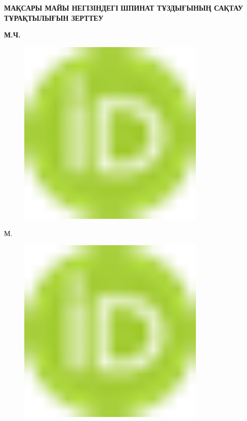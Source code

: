 
{\bfseries МАҚСАРЫ МАЙЫ НЕГІЗІНДЕГІ} {\bfseries ШПИНАТ ТҰЗДЫҒЫНЫҢ САҚТАУ
ТҰРАҚТЫЛЫҒЫН ЗЕРТТЕУ}

{\bfseries М.Ч.
\begin{figure}[H]
	\centering
	\includegraphics[width=0.8\textwidth]{media/pish3/image1}
	\caption*{}
\end{figure}

М.
\begin{figure}[H]
	\centering
	\includegraphics[width=0.8\textwidth]{media/pish3/image1}
	\caption*{}
\end{figure}

}
